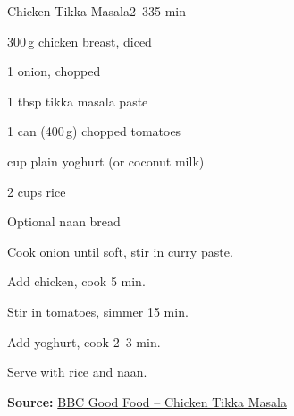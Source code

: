 \begin{recipebox}{Chicken Tikka Masala}{2--3}{35 min}
\begin{ingredients}
  \item 300\,g chicken breast, diced
  \item 1 onion, chopped
  \item 1 tbsp tikka masala paste
  \item 1 can (400\,g) chopped tomatoes
  \item {} cup plain yoghurt (or coconut milk)
  \item 2 cups rice
  \item Optional naan bread
\end{ingredients}

\begin{method}
  \item Cook onion until soft, stir in curry paste.
  \item Add chicken, cook 5 min.
  \item Stir in tomatoes, simmer 15 min.
  \item Add yoghurt, cook 2–3 min.
  \item Serve with rice and naan.
\end{method}
\textbf{Source:} \href{https://www.bbcgoodfood.com/recipes/chicken-tikka-masala}{BBC Good Food – Chicken Tikka Masala}
\end{recipebox}
